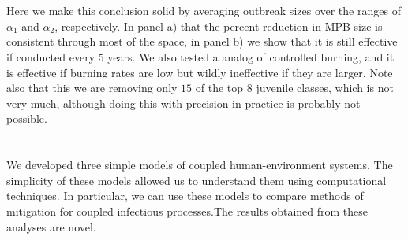 \documentclass{article}
\begin{document}
\section{}

Here we make this conclusion solid by averaging outbreak sizes over the ranges of $\alpha_1$ and $\alpha_2$, respectively. In panel a) that the percent reduction in MPB size is consistent through most of the space, in panel b) we show that it is still effective if conducted every 5 years. We also tested a analog of controlled burning, and it is effective if burning rates are low but wildly ineffective if they are larger. Note also that this we are removing only $15$ of the top 8 juvenile classes, which is not very much, although doing this with precision in practice is probably not possible. 

\section{} 

We developed three simple models of coupled human-environment systems. The simplicity of these models allowed us to understand them using computational techniques. In particular, we can use these models to compare methods of mitigation for coupled infectious processes.The results obtained from these analyses are novel.
\section{}
\end{document}
